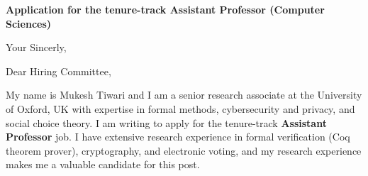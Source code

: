 \documentclass[11pt,a4paper,roman]{moderncv}
\begin{document}
\date{}
\opening{\textbf{Application for the tenure-track Assistant Professor (Computer Sciences)}}
\closing{Your Sincerly, \vspace{-1em}}



\makelettertitle


Dear Hiring Committee, 
\\
\vspace{1em}

My name is Mukesh Tiwari and I am a senior research associate at 
the University of Oxford, UK with expertise in formal methods, cybersecurity and privacy, 
and social choice theory. I am writing to apply for the tenure-track \textbf{Assistant Professor} job. 
I have extensive research experience in
formal verification (Coq theorem prover), cryptography, and electronic voting, and my research 
experience makes me a valuable candidate for this post.
\end{document}
